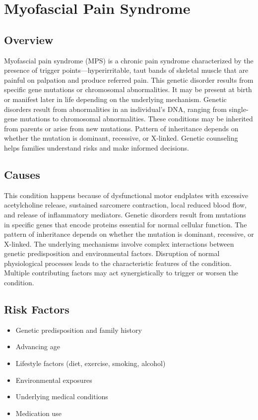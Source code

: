 \chapter{Myofascial Pain Syndrome}
\label{sec:Myofascial Pain Syndrome}

\section{Overview}
Myofascial pain syndrome (MPS) is a chronic pain syndrome characterized by the presence of trigger points---hyperirritable, taut bands of skeletal muscle that are painful on palpation and produce referred pain. This genetic disorder results from specific gene mutations or chromosomal abnormalities. It may be present at birth or manifest later in life depending on the underlying mechanism. Genetic disorders result from abnormalities in an individual's DNA, ranging from single-gene mutations to chromosomal abnormalities. These conditions may be inherited from parents or arise from new mutations. Pattern of inheritance depends on whether the mutation is dominant, recessive, or X-linked. Genetic counseling helps families understand risks and make informed decisions.
\section{Causes}
This condition happens because of dysfunctional motor endplates with excessive acetylcholine release, sustained sarcomere contraction, local reduced blood flow, and release of inflammatory mediators. Genetic disorders result from mutations in specific genes that encode proteins essential for normal cellular function. The pattern of inheritance depends on whether the mutation is dominant, recessive, or X-linked. The underlying mechanisms involve complex interactions between genetic predisposition and environmental factors. Disruption of normal physiological processes leads to the characteristic features of the condition. Multiple contributing factors may act synergistically to trigger or worsen the condition.
\section{Risk Factors}


\begin{itemize}[noitemsep]
  \item Genetic predisposition and family history
  \item Advancing age
  \item Lifestyle factors (diet, exercise, smoking, alcohol)
  \item Environmental exposures
  \item Underlying medical conditions
  \item Medication use
\end{itemize}
